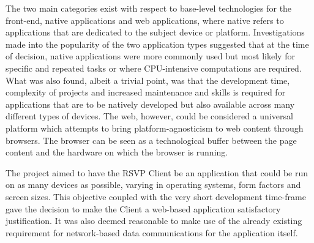       The two main categories exist with respect to base-level technologies for the front-end, native applications and web applications, where native refers to applications that are dedicated to the subject device or platform. Investigations made into the popularity of the two application types \cite{jeffSmith_2016}\cite{samShabaan_2016} suggested that at the time of decision, native applications were more commonly used but most likely for specific and repeated tasks or where CPU-intensive computations are required. What was also found, albeit a trivial point, was that the development time, complexity of projects and increased maintenance and skills is required for applications that are to be natively developed but also available across many different types of devices. The web, however, could be considered a universal platform which attempts to bring platform-agnosticism to web content through browsers. The browser can be seen as a technological buffer between the page content and the hardware on which the browser is running.
      
      The project aimed to have the RSVP Client be an application that could be run on as many devices as possible, varying in operating systems, form factors and screen sizes. This objective coupled with the very short development time-frame gave the decision to make the Client a web-based application satisfactory justification. It was also deemed reasonable to make use of the already existing requirement for network-based data communications for the application itself.
      
